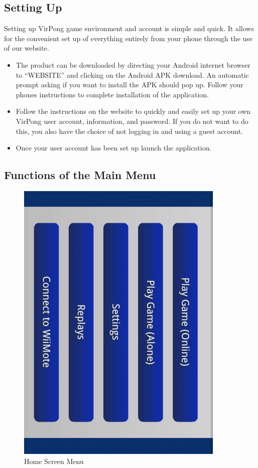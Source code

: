 \documentclass[12pt]{article}
\begin{document}
\subsection{Setting Up}
Setting up VirPong game environment and account is simple and quick. It allows for the convenient set up of everything entirely from your phone through the use of our website.
\begin{itemize}
\item The product can be downloaded by directing your Android internet browser to “WEBSITE” and clicking on the Android APK download. An automatic prompt asking if you want to install the APK should pop up. Follow your phones instructions to complete installation of the application.
\item Follow the instructions on the website to quickly and easily set up your own VirPong user account, information, and password. If you do not want to do this, you also have the choice of not logging in and using a guest account.
\item Once your user account has been set up launch the application.
\end{itemize}
\subsection{Functions of the Main Menu}
\begin{figure}
\begin{center}
\includegraphics[scale=.7]{ homeScreen.png}
\caption{\label{homeScreen}Home Screen Menu}
\end{center}
\end{figure}
\end{document}
